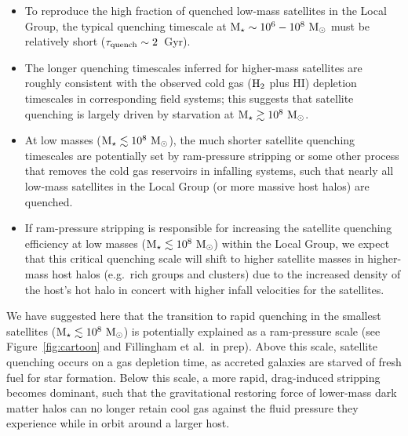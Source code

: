 \begin{itemize}[leftmargin=0.25cm]

\item To reproduce the high fraction of quenched low-mass satellites
  in the Local Group, the typical quenching timescale at ${\rm M}_{\star} \sim
  10^{6}-10^{8}~{\rm M}_{\odot}$ must be relatively short ($\tau_{\rm
    quench} \sim 2$~Gyr).  \\

\item The longer quenching timescales inferred for higher-mass
  satellites are roughly consistent with the observed cold gas (${\rm
    H}_{2}$ plus H{\scriptsize I}) depletion timescales in
  corresponding field systems; this suggests that satellite quenching
  is largely driven by starvation at ${\rm M}_{\star} \gtrsim 10^{8}~{\rm M}_{\odot}$.  \\

\item At low masses (${\rm M}_{\star} \lesssim 10^{8}~{\rm M}_{\odot}$), the much shorter
  satellite quenching timescales are potentially set by ram-pressure
  stripping or some other process that removes the cold gas reservoirs
  in infalling systems, such that nearly all low-mass satellites in
  the Local Group (or more massive host halos) are quenched.

\item If ram-pressure stripping is responsible for increasing the
  satellite quenching efficiency at low masses (${\rm M}_{\star} \lesssim
  10^{8}~{\rm M}_{\odot}$) within the Local Group, we expect that this critical
  quenching scale will shift to higher satellite masses in higher-mass
  host halos (e.g.~rich groups and clusters) due to the increased
  density of the host's hot halo in concert with higher infall
  velocities for the satellites.

\end{itemize}

We have suggested here that the transition to rapid quenching in the
smallest satellites (${\rm M}_{\star} \lesssim 10^{8}~{\rm M}_{\odot}$) is potentially
explained as a ram-pressure scale (see Figure~\ref{fig:cartoon} and
Fillingham et al.~in prep). Above this scale, satellite quenching
occurs on a gas depletion time, as accreted galaxies are starved of
fresh fuel for star formation.  Below this scale, a more rapid,
drag-induced stripping becomes dominant, such that the gravitational
restoring force of lower-mass dark matter halos can no longer retain
cool gas against the fluid pressure they experience while in orbit
around a larger host.
 

